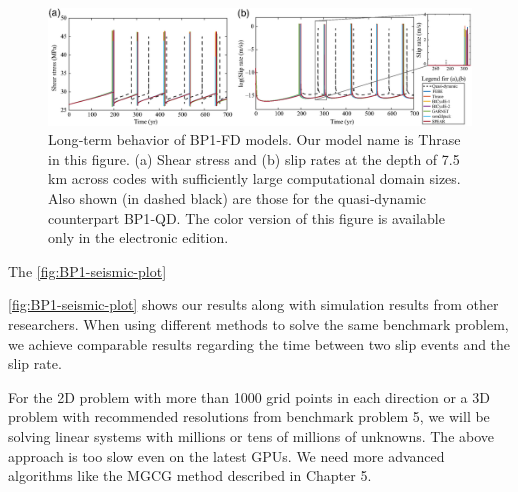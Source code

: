 \begin{figure}
    \centering
    \includegraphics[width=\linewidth]{figures/BP1-seismic-plot.png}
    \caption{Long‐term behavior of BP1‐FD models. Our model name is Thrase in this figure. (a) Shear stress and (b) slip rates at the depth of 7.5 km across codes with sufficiently large computational domain sizes. Also shown (in dashed black) are those for the quasi‐dynamic counterpart BP1‐QD. The color version of this figure is available only in the electronic edition. \citep{erickson2023incorporating}}
    \label{fig:BP1-seismic-plot}
\end{figure}

The \autoref{fig:BP1-seismic-plot}

\autoref{fig:BP1-seismic-plot} shows our results along with simulation results from other researchers. 
When using different methods to solve the same benchmark problem, we achieve comparable results regarding the time between two slip events and the slip rate.


For the 2D problem with more than 1000 grid points in each direction or a 3D problem with recommended resolutions from benchmark problem 5, we will be solving linear systems with millions or tens of millions of unknowns.
The above approach is too slow even on the latest GPUs.
We need more advanced algorithms like the MGCG method described in Chapter 5.

